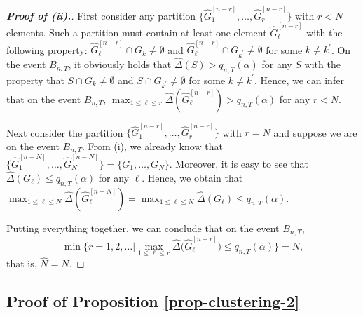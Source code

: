 \begin{proof}[\textnormal{\textbf{Proof of (ii).}}]
First consider any partition $\{ \widehat{G}_1^{[n-r]},\ldots,\widehat{G}_r^{[n-r]} \}$ with $r < N$ elements. Such a partition must contain at least one element $\widehat{G}_\ell^{[n-r]}$ with the following property: $\widehat{G}_\ell^{[n-r]} \cap G_k \ne \emptyset$ and $\widehat{G}_\ell^{[n-r]} \cap G_{k^\prime} \ne \emptyset$ for some $k \ne k^\prime$. On the event $B_{n,T}$, it obviously holds that $\widehat{\Delta}(S) > q_{n,T}(\alpha)$ for any $S$ with the property that $S \cap G_k \ne \emptyset$ and $S \cap G_{k^\prime} \ne \emptyset$ for some $k \ne k^\prime$. Hence, we can infer that on the event $B_{n,T}$, $\max_{1 \le \ell \le r} \widehat{\Delta} ( \widehat{G}_\ell^{[n-r]} ) > q_{n,T}(\alpha)$ for any $r < N$. 

Next consider the partition $\{ \widehat{G}_1^{[n-r]},\ldots,\widehat{G}_r^{[n-r]} \}$ with $r = N$ and suppose we are on the event $B_{n,T}$. From (i), we already know that $\{ \widehat{G}_1^{[n-N]},\ldots,\widehat{G}_N^{[n-N]} \} =\{ G_1,\ldots,G_N \}$. Moreover, it is easy to see that $\widehat{\Delta}(G_\ell) \le q_{n,T}(\alpha)$ for any $\ell$. Hence, we obtain that $\max_{1 \le \ell \le N} \widehat{\Delta} ( \widehat{G}_\ell^{[n-N]} ) = \max_{1 \le \ell \le N} \widehat{\Delta} (G_\ell) \le q_{n,T}(\alpha)$.

Putting everything together, we can conclude that on the event $B_{n,T}$, 
\[ \min \Big\{ r = 1,2,\ldots \Big| \max_{1 \le \ell \le r} \widehat{\Delta} \big( \widehat{G}_\ell^{[n-r]} \big) \le q_{n,T}(\alpha) \Big\} = N, \]
that is, $\widehat{N} = N$. 
\end{proof}



\subsection*{Proof of Proposition \ref{prop-clustering-2}}


